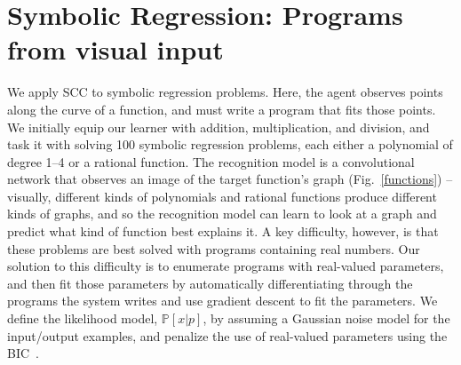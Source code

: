 \documentclass{article}
\newcommand{\system}{\textsc{SCC} }
\newcommand{\probability}{\mathds{P}} %
\begin{document}
\section{Symbolic Regression: Programs from visual input}\label{regressionSection}
We apply \system
to symbolic regression problems.  Here, the
agent observes points along the curve of a function, and must write a
program that fits those points.  We initially equip our learner with
addition, multiplication, and division, and task it with solving
100 symbolic regression problems, each either a polynomial of degree
1--4 or a rational function.  The recognition model is a
convolutional network that observes an image of the target function's
graph (Fig.~\ref{functions}) -- visually, different kinds of
polynomials and rational functions produce different kinds of graphs,
and so the recognition model can learn to look at a graph and predict
what kind of function best explains it.  A key difficulty, however, is
that these problems are best solved with programs containing real
numbers.  Our solution to this difficulty is to enumerate
 programs with real-valued parameters, and then fit those
parameters by automatically differentiating through the programs the
system writes and use gradient descent to fit the parameters.
We define the likelihood model, $\probability[x|p]$, by assuming a Gaussian noise model for the input/output examples,
and penalize the use of real-valued parameters using the BIC~\cite{Bishop:2006:PRM:1162264}.
\end{document}
